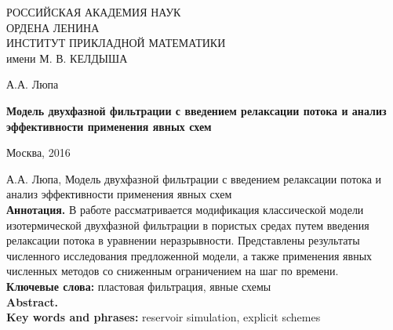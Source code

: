 \begin{titlepage}
\begin{center}

{РОССИЙСКАЯ АКАДЕМИЯ НАУК \\
ОРДЕНА ЛЕНИНА \\
ИНСТИТУТ ПРИКЛАДНОЙ МАТЕМАТИКИ \\
имени М. В. КЕЛДЫША \\
\par}

\vspace{80mm}

{А.А. Люпа\par}

\vspace{10mm}

{\bf \large Модель двухфазной фильтрации с введением релаксации потока
и анализ эффективности применения явных схем
\par}

\end{center}

\vspace{\fill}

\begin{center}
{Москва, 2016}
\end{center}

\clearpage
\end{titlepage}
\newpage


А.А. Люпа, Модель двухфазной фильтрации с введением релаксации потока
и анализ эффективности применения явных схем
\\

{\bf Аннотация.} В работе рассматривается модификация классической модели
изотермической двухфазной фильтрации в пористых средах
путем введения релаксации потока в уравнении неразрывности.
Представлены результаты численного исследования предложенной модели,
а также применения явных численных методов со сниженным ограничением на
шаг по времени.
\\

{\bf Ключевые слова:} пластовая фильтрация, явные схемы
\\

{\bf Abstract.}
\\

{\bf Key words and phrases:} reservoir simulation, explicit schemes
\\